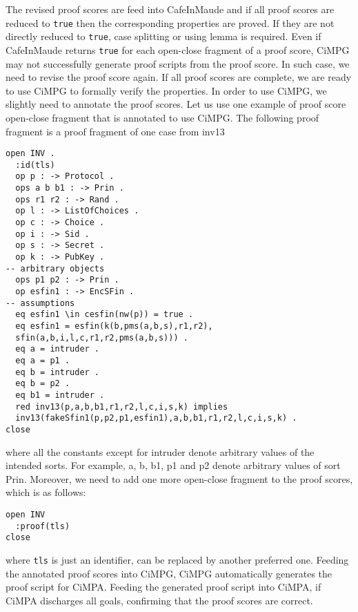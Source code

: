 \documentclass[a4paper,fleqn]{cas-dc}
\begin{document}
The revised proof scores are feed into CafeInMaude and if all proof scores are reduced to \verb!true! then the corresponding properties are proved. If they are not directly reduced to \verb!true!, case splitting or using lemma is required. Even if CafeInMaude returns \verb!true! for each open-close fragment of a proof score, CiMPG may not successfully generate proof scripts from the proof score. In such case, we need to revise the proof score again. If all proof scores are complete, we are ready to use CiMPG to formally verify the properties. In order to use CiMPG, we slightly need to annotate the proof scores. Let us use one example of proof score open-close fragment that is annotated to use CiMPG. The following proof fragment is a proof fragment of one case from inv13
\begin{small}
\begin{verbatim}
open INV .
  :id(tls)
  op p : -> Protocol .
  ops a b b1 : -> Prin .
  ops r1 r2 : -> Rand .
  op l : -> ListOfChoices .
  op c : -> Choice .
  op i : -> Sid .
  op s : -> Secret .
  op k : -> PubKey .
-- arbitrary objects
  ops p1 p2 : -> Prin .
  op esfin1 : -> EncSFin .
-- assumptions
  eq esfin1 \in cesfin(nw(p)) = true .
  eq esfin1 = esfin(k(b,pms(a,b,s),r1,r2),
  sfin(a,b,i,l,c,r1,r2,pms(a,b,s))) .
  eq a = intruder .
  eq a = p1 .
  eq b = intruder .
  eq b = p2 .
  eq b1 = intruder . 
  red inv13(p,a,b,b1,r1,r2,l,c,i,s,k) implies
  inv13(fakeSfin1(p,p2,p1,esfin1),a,b,b1,r1,r2,l,c,i,s,k) .
close
\end{verbatim}
\end{small}
where all the constants except for intruder denote arbitrary
values of the intended sorts. For example, a, b, b1, p1 and p2 denote arbitrary values of sort Prin. Moreover, we need to add one more open-close fragment to the proof scores, which is as follows:
\begin{small}
\begin{verbatim}
open INV
  :proof(tls)
close
\end{verbatim}
\end{small}
where \verb!tls! is just an identifier, can be replaced by another preferred one. Feeding the annotated proof scores into CiMPG, CiMPG automatically generates the proof script for CiMPA. Feeding the generated proof script into CiMPA, if CiMPA discharges all goals, confirming that the proof scores are correct. 
\end{document}
